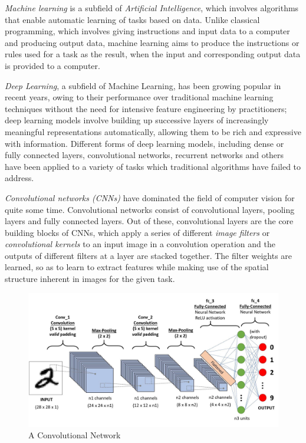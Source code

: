 
\par \textit{Machine learning} is a subfield of \textit{Artificial Intelligence}, which involves algorithms that enable automatic learning of tasks based on data. Unlike classical programming, which involves giving instructions and input data to a computer and producing output data, machine learning aims to produce the instructions or rules used for a task as the result, when the input and corresponding output data is provided to a computer.

\par \textit{Deep Learning}, a subfield of Machine Learning, has been growing popular in recent years, owing to their performance over traditional machine learning techniques without the need for intensive feature engineering by practitioners; deep learning models involve building up successive layers of increasingly meaningful representations automatically, allowing them to be rich and expressive with information. Different forms of deep learning models, including dense or fully connected layers, convolutional networks, recurrent networks and others have been applied to a variety of tasks which traditional algorithms have failed to address.

\par \textit{Convolutional networks (CNNs)} have dominated the field of computer vision for quite some time. Convolutional networks consist of convolutional layers, pooling layers and fully connected layers. Out of these, convolutional layers are the core building blocks of CNNs, which apply a series of different \textit{image filters} or \textit{convolutional kernels} to an input image in a convolution operation and the outputs of different filters at a layer are stacked together. The filter weights are learned, so as to learn to extract features while making use of the spatial structure inherent in images for the given task.
\begin{figure}[h]
\centering
\includegraphics[width=\linewidth]{assets/img/cnn.jpeg}
\caption{A Convolutional Network}
\label{fig:cnn}
\end{figure}

